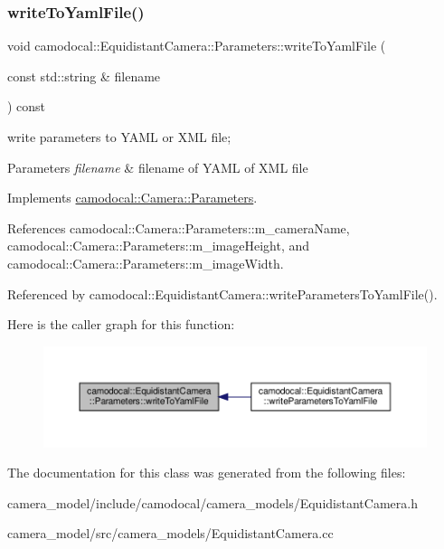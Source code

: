 \subsubsection{\texorpdfstring{write\+To\+Yaml\+File()}{writeToYamlFile()}}
{\footnotesize\ttfamily void camodocal\+::\+Equidistant\+Camera\+::\+Parameters\+::write\+To\+Yaml\+File (\begin{DoxyParamCaption}\item[{const std\+::string \&}]{filename }\end{DoxyParamCaption}) const\hspace{0.3cm}{\ttfamily [virtual]}}



write parameters to Y\+A\+ML or X\+ML file; 


\begin{DoxyParams}{Parameters}
{\em filename} & filename of Y\+A\+ML of X\+ML file \\
\hline
\end{DoxyParams}


Implements \hyperlink{classcamodocal_1_1Camera_1_1Parameters_a7da3e505d5b047c7bfa3cf94d6c97710}{camodocal\+::\+Camera\+::\+Parameters}.



References camodocal\+::\+Camera\+::\+Parameters\+::m\+\_\+camera\+Name, camodocal\+::\+Camera\+::\+Parameters\+::m\+\_\+image\+Height, and camodocal\+::\+Camera\+::\+Parameters\+::m\+\_\+image\+Width.



Referenced by camodocal\+::\+Equidistant\+Camera\+::write\+Parameters\+To\+Yaml\+File().

Here is the caller graph for this function\+:\nopagebreak
\begin{figure}[H]
\begin{center}
\leavevmode
\includegraphics[width=350pt]{classcamodocal_1_1EquidistantCamera_1_1Parameters_afb2ad6884187c2b5e9f70f3e54e30321_icgraph}
\end{center}
\end{figure}


The documentation for this class was generated from the following files\+:\begin{DoxyCompactItemize}
\item 
camera\+\_\+model/include/camodocal/camera\+\_\+models/Equidistant\+Camera.\+h\item 
camera\+\_\+model/src/camera\+\_\+models/Equidistant\+Camera.\+cc\end{DoxyCompactItemize}
